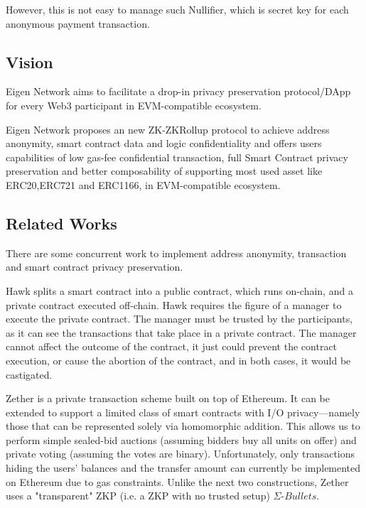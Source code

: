 \documentclass{article}
\begin{document}
However, this is not easy to manage such Nullifier, which is secret key for each anonymous payment transaction. 

\subsection{Vision}

Eigen Network aims to facilitate a drop-in privacy preservation protocol/DApp for every Web3 participant in EVM-compatible ecosystem.

Eigen Network proposes an new ZK-ZKRollup protocol to achieve address anonymity, smart contract data and logic confidentiality and offers users capabilities of low gas-fee confidential transaction, full Smart Contract privacy preservation and better composability of supporting most used asset like ERC20,ERC721 and ERC1166, in EVM-compatible ecosystem.

\subsection{Related Works}

There are some concurrent work to implement address anonymity, transaction and smart contract privacy preservation. 

Hawk\cite{kosba2016hawk} splits a smart contract into a public contract, which runs on-chain, and a private contract executed off-chain. Hawk requires the figure of a manager to execute the private contract. The manager must be trusted by the participants, as it can see the transactions that take place in a private contract. The manager cannot affect the outcome of the contract, it just could prevent the contract execution, or cause the abortion of the contract, and in both cases, it would be castigated.

Zether\cite{bunz2020zether} is a private transaction scheme built on top of Ethereum. It can be extended to support a limited class of smart contracts with I/O privacy—namely those that can be represented solely via homomorphic addition. This allows us to perform simple sealed-bid auctions (assuming bidders buy all units on offer) and private voting (assuming the votes are binary). Unfortunately, only transactions hiding the users' balances and the transfer amount can currently be implemented on Ethereum due to gas constraints. Unlike the next two constructions, Zether uses a "transparent" ZKP (i.e. a ZKP with no trusted setup) $\Sigma\mbox{-}Bullets$.

\end{document}

